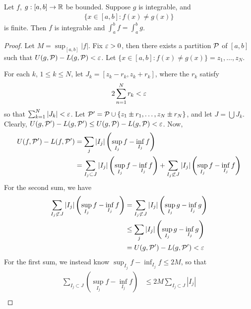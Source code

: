 \documentclass{../template/note}
\begin{document}
    \begin{lemma}
        \label{finite-diff-integrable}
        Let \(f\), \(g: [a, b] \to \mathbb R\) be bounded. Suppose \(g\) is integrable, and 
        \begin{align*}
            \{x \in [a, b]: f(x) \neq g(x)\}
        \end{align*}
        is finite. Then \(f\) is integrable and \(\int_a^b f = \int_a^b g\).
    \end{lemma}
    
    \begin{proof}
        Let \(M = \sup_{[a, b]} |f|\). Fix \(\varepsilon > 0\), then there exists a partition \(\mathcal{P}\) of \([a, b]\) such that \(U(g, \mathcal{P}) - L(g, \mathcal{P}) < \varepsilon\). Let \(\{x \in [a, b]: f(x) \neq g(x)\} = {z_1, \dots, z_N}\).

        For each \(k\), \(1 \leq k \leq N\), let \(J_k = [z_k-r_k, z_k+r_k]\), where the \(r_k\) satisfy
        \begin{align*}
            2\sum_{n=1}^N r_k < \varepsilon
        \end{align*}
        so that \(\sum_{k=1}^N |J_k| < \varepsilon\). Let \(\mathcal{P}' = \mathcal{P} \cup \{z_1 \pm r_1, \dots, z_N \pm r_N\}\), and let \(J = \bigcup J_k\). Clearly, \(U(g, \mathcal{P}') - L(g, \mathcal{P}') \leq U(g, \mathcal{P}) - L(g, \mathcal{P}) < \varepsilon\). Now,
        \begin{align*}
            U(f, \mathcal{P}') - L(f, \mathcal{P}') &= \sum_{j} |I_j| \left(\sup_{I_j} f - \inf_{I_j} f\right) \\
            &= \sum_{I_j \subset J} |I_j| \left(\sup_{I_j} f - \inf_{I_j} f\right) + \sum_{I_j \not\subset J} |I_j| \left(\sup_{I_j} f - \inf_{I_j} f\right)
        \end{align*}
        For the second sum, we have
        \begin{align*}
            \sum_{I_j \not\subset J} |I_j| \left(\sup_{I_j} f - \inf_{I_j} f\right) &= \sum_{I_j \not\subset J} |I_j| \left(\sup_{I_j} g - \inf_{I_j} g\right) \\
            &\leq \sum_j |I_j| \left(\sup_{I_j} g - \inf_{I_j} g\right) \\
            &= U(g, \mathcal{P}') - L(g, \mathcal{P}') < \varepsilon
        \end{align*}
        For the first sum, we instead know \(\sup_{I_j} f - \inf_{I_j} f \leq 2M\), so that
        \begin{align*}
            \sum_{I_j \subset J} \left(\sup_{I_j} f - \inf_{I_j} f\right) &\leq 2M \sum_{I_j \subset J} |I_j| \\

\end{align*}
\end{proof}
\end{document}
